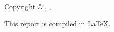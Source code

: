 \thispagestyle{empty}
{\small
\strut\vfill %
\begin{center}
Copyright \copyright{} \projectGroup{}, \projectFaculty{}, \AAU{} \the\year\par 

\vspace{0.2cm}

This report is compiled in \LaTeX.
\end{center} 

}
\clearpage

